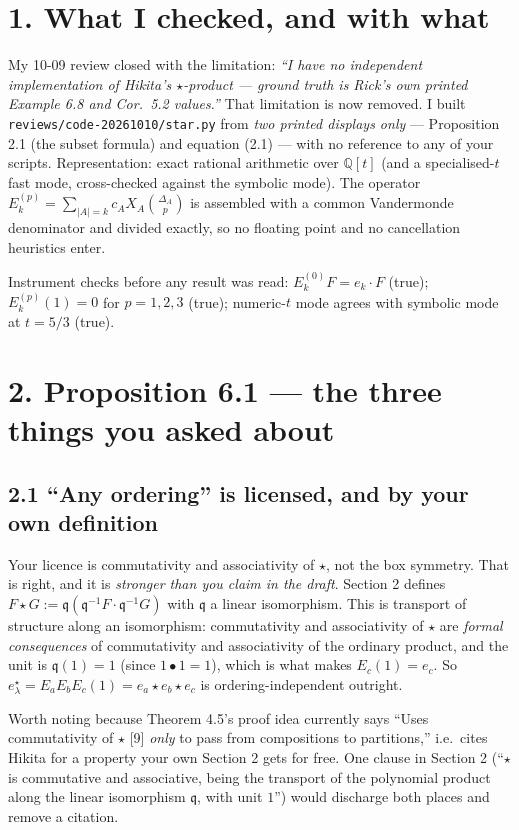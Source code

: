 \documentclass[11pt]{article}
\begin{document}
\section*{1. What I checked, and with what}

My 10-09 review closed with the limitation: \emph{``I have no independent implementation of
Hikita's $\star$-product --- ground truth is Rick's own printed Example 6.8 and Cor.\ 5.2
values.''} That limitation is now removed. I built
\texttt{reviews/code-20261010/star.py} from \emph{two printed displays only} --- Proposition 2.1
(the subset formula) and equation (2.1) --- with no reference to any of your scripts.
Representation: exact rational arithmetic over $\mathbb{Q}[t]$ (and a specialised-$t$ fast mode,
cross-checked against the symbolic mode). The operator
$E_k^{(p)}=\sum_{|A|=k}c_AX_A\binom{\Delta_A}{p}$ is assembled with a common Vandermonde
denominator and divided exactly, so no floating point and no cancellation heuristics enter.

Instrument checks before any result was read:
$E_k^{(0)}F=e_k\cdot F$ (true); $E_k^{(p)}(1)=0$ for $p=1,2,3$ (true);
numeric-$t$ mode agrees with symbolic mode at $t=5/3$ (true).

\section*{2. Proposition 6.1 --- the three things you asked about}

\subsection*{2.1 ``Any ordering'' is licensed, and by your own definition}

Your licence is commutativity and associativity of $\star$, not the box symmetry. That is right,
and it is \emph{stronger than you claim in the draft}. Section 2 defines
$F\star G:=\mathfrak q(\mathfrak q^{-1}F\cdot\mathfrak q^{-1}G)$ with $\mathfrak q$ a linear
isomorphism. This is transport of structure along an isomorphism: commutativity and
associativity of $\star$ are \emph{formal consequences} of commutativity and associativity of the
ordinary product, and the unit is $\mathfrak q(1)=1$ (since $1\bullet1=1$), which is what makes
$E_c(1)=e_c$. So $e^\star_\lambda=E_aE_bE_c(1)=e_a\star e_b\star e_c$ is ordering-independent
outright.

Worth noting because Theorem 4.5's proof idea currently says ``Uses commutativity of $\star$
[9] \emph{only} to pass from compositions to partitions,'' i.e.\ cites Hikita for a property
your own Section 2 gets for free. One clause in Section 2 (``$\star$ is commutative and
associative, being the transport of the polynomial product along the linear isomorphism
$\mathfrak q$, with unit $1$'') would discharge both places and remove a citation.
\end{document}
